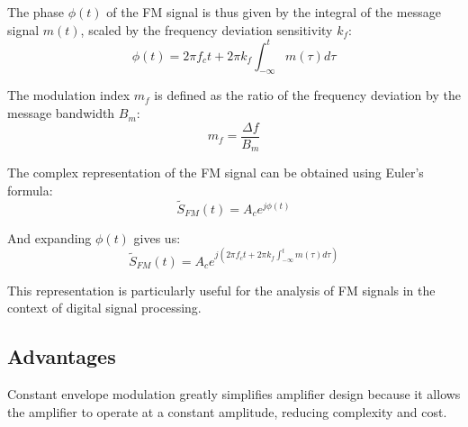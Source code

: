 The phase \( \phi(t) \) of the FM signal is thus given by the integral of the message signal \( m(t) \), scaled by the frequency deviation sensitivity \( k_f \):
\begin{equation}
    \phi(t) = 2\pi f_c t + 2\pi k_f \int_{-\infty}^{t} m(\tau) d\tau
\end{equation}

The modulation index \( m_f \) is defined as the ratio of the frequency deviation by the message bandwidth \( B_m \):
\begin{equation}
    m_f = \frac{\Delta f}{B_m}
\end{equation}

The complex representation of the FM signal can be obtained using Euler's formula:
\begin{equation}
    \tilde{S}_{FM}(t) = A_c e^{j\phi(t)}
\end{equation}

And expanding \( \phi(t) \) gives us:
\begin{equation}
    \tilde{S}_{FM}(t) = A_c e^{j\left(2\pi f_c t + 2\pi k_f \int_{-\infty}^{t} m(\tau) d\tau\right)}
\end{equation}

This representation is particularly useful for the analysis of FM signals in the context of digital signal processing.



\subsection*{Advantages}
Constant envelope modulation greatly simplifies amplifier design because it allows the amplifier to operate at a constant amplitude, reducing complexity and cost.

